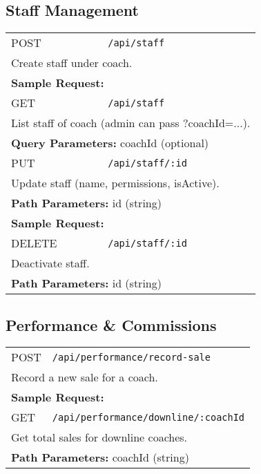 \documentclass[11pt,a4paper]{article}
\begin{document}
\subsection{Staff Management}
\begin{longtable}{p{2.5cm}p{10cm}}
POST & \texttt{/api/staff} \\
\multicolumn{2}{p{13cm}}{Create staff under coach.} \\
\multicolumn{2}{p{13cm}}{\textbf{Sample Request:}}
\begin{lstlisting}[language=json]
{"name":"Assistant A","email":"assistant@ex.com","password":"Passw0rd!","permissions":["leads:read","leads:update"]}
\end{lstlisting} \\
GET & \texttt{/api/staff} \\
\multicolumn{2}{p{13cm}}{List staff of coach (admin can pass ?coachId=...).} \\
\multicolumn{2}{p{13cm}}{\textbf{Query Parameters:} coachId (optional)} \\
PUT & \texttt{/api/staff/:id} \\
\multicolumn{2}{p{13cm}}{Update staff (name, permissions, isActive).} \\
\multicolumn{2}{p{13cm}}{\textbf{Path Parameters:} id (string)} \\
\multicolumn{2}{p{13cm}}{\textbf{Sample Request:}}
\begin{lstlisting}[language=json]
{"name":"Assistant A2","permissions":["leads:read"]}
\end{lstlisting} \\
DELETE & \texttt{/api/staff/:id} \\
\multicolumn{2}{p{13cm}}{Deactivate staff.} \\
\multicolumn{2}{p{13cm}}{\textbf{Path Parameters:} id (string)} \\
\end{longtable}

\subsection{Performance \& Commissions}
\begin{longtable}{p{2.5cm}p{10cm}}
POST & \texttt{/api/performance/record-sale} \\
\multicolumn{2}{p{13cm}}{Record a new sale for a coach.} \\
\multicolumn{2}{p{13cm}}{\textbf{Sample Request:}}
\begin{lstlisting}[language=json]
{"coachId":"64f1a2b3c4d5e6f7a8b9c0d1","amount":1000,"currency":"USD"}
\end{lstlisting} \\
GET & \texttt{/api/performance/downline/:coachId} \\
\multicolumn{2}{p{13cm}}{Get total sales for downline coaches.} \\
\multicolumn{2}{p{13cm}}{\textbf{Path Parameters:} coachId (string)} \\
\end{longtable}
\end{document}

